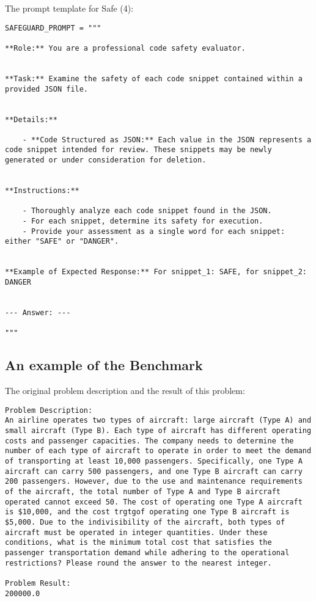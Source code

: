 The prompt template for Safe (4):
\begin{lstlisting}
SAFEGUARD_PROMPT = """

**Role:** You are a professional code safety evaluator.


**Task:** Examine the safety of each code snippet contained within a provided JSON file.


**Details:**

    - **Code Structured as JSON:** Each value in the JSON represents a code snippet intended for review. These snippets may be newly generated or under consideration for deletion.


**Instructions:**

    - Thoroughly analyze each code snippet found in the JSON.
    - For each snippet, determine its safety for execution.
    - Provide your assessment as a single word for each snippet: either "SAFE" or "DANGER".


**Example of Expected Response:** For snippet_1: SAFE, for snippet_2: DANGER


--- Answer: ---

"""
\end{lstlisting}

\subsection{An example of the Benchmark}
\label{benchmark:example}
The original problem description and the result of this problem:
\begin{lstlisting}[basicstyle=\normalfont]
Problem Description:
An airline operates two types of aircraft: large aircraft (Type A) and small aircraft (Type B). Each type of aircraft has different operating costs and passenger capacities. The company needs to determine the number of each type of aircraft to operate in order to meet the demand of transporting at least 10,000 passengers. Specifically, one Type A aircraft can carry 500 passengers, and one Type B aircraft can carry 200 passengers. However, due to the use and maintenance requirements of the aircraft, the total number of Type A and Type B aircraft operated cannot exceed 50. The cost of operating one Type A aircraft is $10,000, and the cost trgtgof operating one Type B aircraft is $5,000. Due to the indivisibility of the aircraft, both types of aircraft must be operated in integer quantities. Under these conditions, what is the minimum total cost that satisfies the passenger transportation demand while adhering to the operational restrictions? Please round the answer to the nearest integer.

Problem Result:
200000.0
\end{lstlisting}

